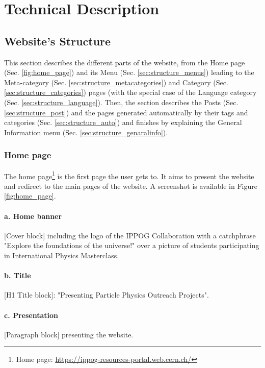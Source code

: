 \part{Technical Description}\label{part:tech}

\chapter{Website's Structure}\label{chap:structure}

This section describes the different parts of the website, from the Home page (Sec. \ref{fig:home_page}) and its Menu (Sec. \ref{sec:structure_menus}) leading to the Meta-category (Sec. \ref{sec:structure_metacategories}) and Category (Sec. \ref{sec:structure_categories}) pages (with the special case of the Language category (Sec. \ref{sec:structure_language}). Then, the section describes the Posts (Sec. \ref{sec:structure_post}) and the pages generated automatically by their tags and categories (Sec. \ref{sec:structure_auto}) and finishes by explaining the General Information menu (Sec. \ref{sec:structure_genaralinfo}).

\section{Home page}\label{sec:structure_home_page}

The home page\footnote{Home page: \href{https://ippog-resources-portal.web.cern.ch/}{https://ippog-resources-portal.web.cern.ch/}} is the first page the user gets to. It aims to present the website and redirect to the main pages of the website. A screenshot is available in Figure \ref{fig:home_page}.

\subsection*{a. Home banner}
[Cover block] including the logo of the IPPOG Collaboration with a catchphrase "Explore the foundations of the universe!" over a picture of students participating in International Physics Masterclass.

\subsection*{b. Title}
[H1 Title block]: "Presenting Particle Physics Outreach Projects".

\subsection*{c. Presentation}
[Paragraph block] presenting the website.

